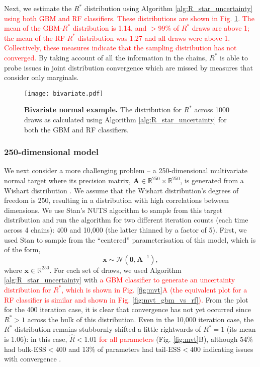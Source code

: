 \documentclass{article}
\begin{document}
Next, we estimate the $R^*$ distribution using Algorithm \ref{alg:R_star_uncertainty} \textcolor{red}{using both GBM and RF classifiers. These distributions are shown in Fig. \ref{fig:bivariate}. The mean of the GBM-$R^*$ distribution is 1.14, and $>$99\% of $R^*$ draws are above 1; the mean of the RF-$R^*$ distribution was 1.27 and all draws were above 1. Collectively, these measures indicate that the sampling distribution has not converged.} By taking account of all the information in the chains, $R^*$ is able to probe issues in joint distribution convergence which are missed by measures that consider only marginals.

\begin{figure}[!htb]
	\centerline{\texttt{[image: bivariate.pdf]}}
	\caption{\textbf{Bivariate normal example.} The distribution for $R^*$ across 1000 draws as calculated using Algorithm \ref{alg:R_star_uncertainty} for both the GBM and RF classifiers.}
	\label{fig:bivariate}
\end{figure}

\subsubsection{250-dimensional model}\label{sec:multivariate_normal_250}
We next consider a more challenging problem -- a 250-dimensional multivariate normal target where its precision matrix, $\boldsymbol{A}\in\mathbb{R}^{250}\times\mathbb{R}^{250}$, is generated from a Wishart distribution \citep{hoffman2014no}. We assume that the Wishart distribution's degrees of freedom is 250, resulting in a distribution with high correlations between dimensions. We use Stan's NUTS algorithm \citep{betancourt2017conceptual} to sample from this target distribution and run the algorithm for two different iteration counts (each time across 4 chains): 400 and 10,000 (the latter thinned by a factor of 5). First, we used Stan to sample from the ``centered'' parameterisation of this model, which is of the form,
%
\begin{equation}\label{eq:mvt_normal_250}
\boldsymbol{x}\sim \mathcal{N}(\boldsymbol{0},\boldsymbol{A}^{-1}),
\end{equation}
%
where $\boldsymbol{x}\in\mathbb{R}^{250}$. For each set of draws, we used Algorithm \ref{alg:R_star_uncertainty} with \textcolor{red}{a GBM classifier to generate an uncertainty distribution for $R^*$, which is shown in Fig. \ref{fig:mvt}A (the equivalent plot for a RF classifier is similar and shown in Fig. \ref{fig:mvt_gbm_vs_rf}).} From the plot for the 400 iteration case, it is clear that convergence has not yet occurred since $R^*>1$ across the bulk of this distribution. Even in the 10,000 iteration case, the $R^*$ distribution remains stubbornly shifted a little rightwards of $R^*=1$ (its mean is 1.06): in this case, $\widehat{R}<1.01$ \textcolor{red}{for all parameters} (Fig. \ref{fig:mvt}B), although 54\% had bulk-$\text{ESS}<400$ and 13\% of parameters had tail-$\text{ESS}<400$ indicating issues with convergence \citep{vehtari2019rank}.
\end{document}
